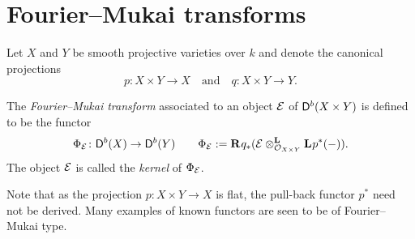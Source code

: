 \section{Fourier--Mukai transforms}
\label{Chapter: Fourier-Mukai transforms}

Let $X$ and $Y$ be smooth projective varieties over $k$ and denote the canonical projections 
\[
    p \colon X \times Y \to X \quad \text{and} \quad q \colon X \times Y \to Y.
\]

\begin{definition}
    The \emph{Fourier--Mukai transform} associated to an object $\E$ of $\derb{X \times Y}$ is defined to be the functor
    \[
        \fm{\E} \colon \derb{X} \to \derb{Y} \qquad \fm{\E} := \rderived{}{q_*}(\derivedtensor{\E}{\lderived{}{p^*}(-)}{\struct{X \times Y}}).
    \]
    The object $\E$ is called the \emph{kernel} of $\fm{\E}$.
\end{definition}

Note that as the projection $p \colon X \times Y \to X$ is flat, the pull-back functor $p^*$ need not be derived. Many examples of known functors are seen to be of Fourier--Mukai type.

